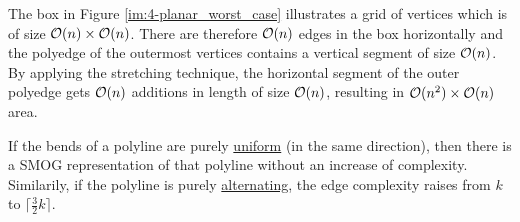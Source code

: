 The box in Figure \ref{im:4-planar_worst_case} illustrates a grid of vertices which is of size $\mathcal{O}(n)\times\mathcal{O}(n)$. There are therefore $\mathcal{O}(n)$ edges in the box horizontally and the polyedge of the outermost vertices contains a vertical segment of size $\mathcal{O}(n)$. By applying the stretching technique, the horizontal segment of the outer polyedge gets $\mathcal{O}(n)$ additions in length of size $\mathcal{O}(n)$, resulting in $\mathcal{O}(n^2)\times\mathcal{O}(n)$ area.
\begin{theorem}
	If the bends of a polyline are purely \underline{uniform} (in the same direction), then there is a SMOG representation of that polyline without an increase of complexity. Similarily, if the polyline is purely \underline{alternating}, the edge complexity raises from $k$ to $\lceil\frac{3}{2}k\rceil$.
\end{theorem}
